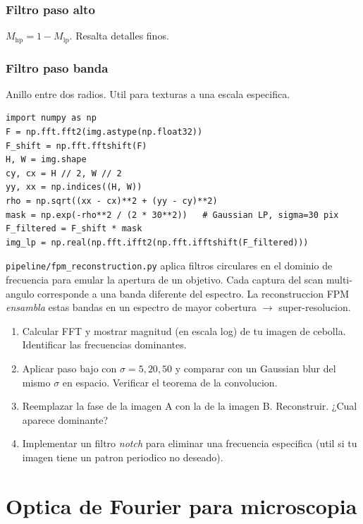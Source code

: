 \documentclass[11pt,a4paper,twoside,openright]{book}
\begin{document}
\subsection{Filtro paso alto}
$M_{\text{hp}} = 1 - M_{\text{lp}}$. Resalta detalles finos.

\subsection{Filtro paso banda}
Anillo entre dos radios. Util para texturas a una escala especifica.

\begin{lstlisting}[caption={Filtrado paso bajo via FFT.}]
import numpy as np
F = np.fft.fft2(img.astype(np.float32))
F_shift = np.fft.fftshift(F)
H, W = img.shape
cy, cx = H // 2, W // 2
yy, xx = np.indices((H, W))
rho = np.sqrt((xx - cx)**2 + (yy - cy)**2)
mask = np.exp(-rho**2 / (2 * 30**2))   # Gaussian LP, sigma=30 pix
F_filtered = F_shift * mask
img_lp = np.real(np.fft.ifft2(np.fft.ifftshift(F_filtered)))
\end{lstlisting}

\begin{pipeline}
\texttt{pipeline/fpm\_reconstruction.py} aplica filtros circulares en el dominio de frecuencia para emular la apertura de un objetivo. Cada captura del scan multi-angulo corresponde a una banda diferente del espectro. La reconstruccion FPM \emph{ensambla} estas bandas en un espectro de mayor cobertura $\to$ super-resolucion.
\end{pipeline}

\begin{ejercicio}
\begin{enumerate}[leftmargin=2em]
  \item Calcular FFT y mostrar magnitud (en escala log) de tu imagen de cebolla. Identificar las frecuencias dominantes.
  \item Aplicar paso bajo con $\sigma = 5, 20, 50$ y comparar con un Gaussian blur del mismo $\sigma$ en espacio. Verificar el teorema de la convolucion.
  \item Reemplazar la fase de la imagen A con la de la imagen B. Reconstruir. ¿Cual aparece dominante?
  \item Implementar un filtro \emph{notch} para eliminar una frecuencia especifica (util si tu imagen tiene un patron periodico no deseado).
\end{enumerate}
\end{ejercicio}

\chapter{Optica de Fourier para microscopia}
\label{ch:optica}
\end{document}
